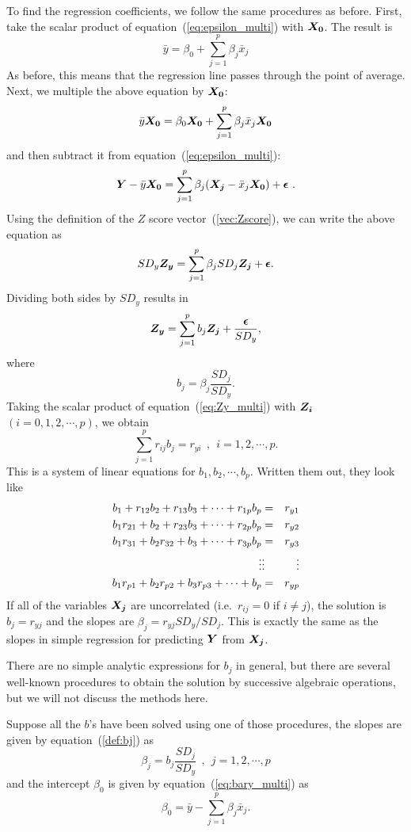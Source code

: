 \documentclass[11pt]{article}
\newcommand{\beq}{\begin{equation}}
\newcommand{\eeq}{\end{equation}}
\newcommand{\beqn}{\begin{eqnarray}}
\newcommand{\eeqn}{\end{eqnarray}}
\newcommand{\ve}[1]{\mbox{\boldmath $#1$}}
\begin{document}
To find the regression coefficients, we follow the same procedures as before. 
First, take the scalar product of equation~(\ref{eq:epsilon_multi}) with $\ve{X_0}$. 
The result is 
\beq
  \bar{y} = \beta_0 + \sum_{j=1}^p \beta_j \bar{x}_j 
\label{eq:bary_multi}
\eeq
As before, this means that the regression line passes through the point of 
average. Next, we multiple the above equation by $\ve{X_0}$: 
\[
  \bar{y} \ve{X_0} = \beta_0 \ve{X_0} + \sum_{j=1}^p \beta_j \bar{x}_j \ve{X_0} 
\]
and then subtract it from equation~(\ref{eq:epsilon_multi}):
\[
  \ve{Y} - \bar{y} \ve{X_0} = \sum_{j=1}^p \beta_j (\ve{X_j}-\bar{x}_j \ve{X_0}) 
+ \ve{\epsilon} \ .
\]
Using the definition of the $Z$ score vector~(\ref{vec:Zscore}), we can 
write the above equation as 
\[
   SD_y \ve{Z_y} = \sum_{j=1}^p \beta_j SD_j \ve{Z_j} + \ve{\epsilon} .
\]
Dividing both sides by $SD_y$ results in 
\beq
  \ve{Z_y} = \sum_{j=1}^p b_j \ve{Z_j} + \frac{\ve{\epsilon}}{SD_y} ,
\label{eq:Zy_multi}
\eeq
where 
\beq
  b_j = \beta_j \frac{SD_j}{SD_y} .
\label{def:bj}
\eeq
Taking the scalar product of equation~(\ref{eq:Zy_multi}) with $\ve{Z_i}$ 
$(i=0,1,2,\cdots,p)$, we obtain 
\beq
  \sum_{j=1}^p r_{ij} b_j = r_{yi} \ \ , \ \ i=1,2,\cdots, p. 
\label{eq:beqs}
\eeq
This is a system of linear equations for $b_1,b_2,\cdots,b_p$. Written them out, 
they look like 
\beqn
  b_1 + r_{12} b_2 + r_{13} b_3 + \cdots + r_{1p} b_p &=& r_{y1} \cr 
  b_1 r_{21} + b_2 + r_{23} b_3 + \cdots + r_{2p} b_p &=& r_{y2} \cr 
  b_1 r_{31} + b_2 r_{32} + b_3 + \cdots + r_{3p} b_p &=& r_{y3} \cr 
  \vdots & \vdots & \vdots \cr 
  b_1 r_{p1} + b_2 r_{p2} + b_3 r_{p3} + \cdots + b_p &=& r_{yp} \nonumber 
\eeqn
If all of the variables $\ve{X_j}$ are uncorrelated (i.e.\ $r_{ij}=0$ 
if $i\neq j$), the solution is $b_j=r_{yj}$ and the slopes are 
$\beta_j=r_{yj} SD_y/SD_j$. This is exactly the same as the slopes 
in simple regression for predicting $\ve{Y}$ from $\ve{X_j}$. 

There are no simple analytic expressions for $b_j$ in general, but 
there are several well-known procedures to obtain the solution by successive 
algebraic operations, but we will not discuss the methods here.

Suppose all the $b$'s have been solved using one of those 
procedures, the slopes are given by equation~(\ref{def:bj}) as 
\beq
  \beta_j = b_j \frac{SD_j}{SD_y}  \ \ , \ \ j=1,2,\cdots, p 
\label{eq:slopes_multi}
\eeq
and the intercept $\beta_0$ is given by equation~(\ref{eq:bary_multi}) as 
\beq
  \beta_0 = \bar{y} - \sum_{j=1}^p \beta_j \bar{x}_j .
\label{eq:intercept_multi}
\eeq
\end{document}
